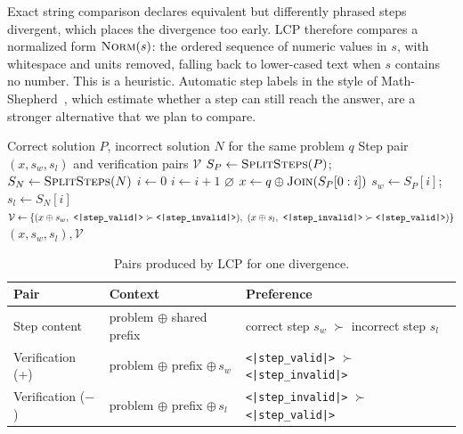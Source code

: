 \documentclass[11pt, a4paper]{article}
\newcommand{\valid}{\texttt{<|step\_\allowbreak valid|>}}
\newcommand{\invalid}{\texttt{<|step\_\allowbreak invalid|>}}
\begin{document}
Exact string comparison declares equivalent but differently phrased steps divergent, which places the divergence too early. LCP therefore compares a normalized form $\textsc{Norm}(s)$: the ordered sequence of numeric values in $s$, with whitespace and units removed, falling back to lower-cased text when $s$ contains no number. This is a heuristic. Automatic step labels in the style of Math-Shepherd~\cite{wang2024mathshepherd}, which estimate whether a step can still reach the answer, are a stronger alternative that we plan to compare.

\begin{algorithm}[t]
\caption{LCP: divergence detection and pair construction}
\label{alg:lcp}
\begin{algorithmic}[1]
\Require Correct solution $P$, incorrect solution $N$ for the same problem $q$
\Ensure Step pair $(x, s_w, s_l)$ and verification pairs $\mathcal{V}$
\State $S_P \gets \textsc{SplitSteps}(P)$; \quad $S_N \gets \textsc{SplitSteps}(N)$
\State $i \gets 0$
    \State $i \gets i + 1$
\EndWhile
{} \Return $\varnothing$ 
\EndIf
\State $x \gets q \oplus \textsc{Join}(S_P[0:i])$ 
\State $s_w \gets S_P[i]$; \quad $s_l \gets S_N[i]$ 
\State $\mathcal{V} \gets \{(x\oplus s_w,\ \valid \succ \invalid),\ (x\oplus s_l,\ \invalid \succ \valid)\}$
\State \Return $(x, s_w, s_l), \mathcal{V}$
\end{algorithmic}
\end{algorithm}

\begin{table}[t]
\centering
\caption{Pairs produced by LCP for one divergence.}
\label{tab:dpo_dataset}
\small
\begin{tabularx}{\textwidth}{lXX}
\toprule
\textbf{Pair} & \textbf{Context} & \textbf{Preference} \\
\midrule
Step content & problem $\oplus$ shared prefix & correct step $s_w$ $\succ$ incorrect step $s_l$ \\
Verification (+) & problem $\oplus$ prefix $\oplus\, s_w$ & \valid{} $\succ$ \invalid{} \\
Verification ($-$) & problem $\oplus$ prefix $\oplus\, s_l$ & \invalid{} $\succ$ \valid{} \\
\bottomrule
\end{tabularx}
\end{table}
\end{document}
